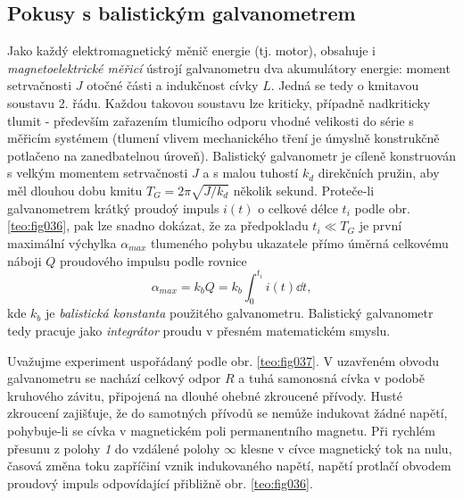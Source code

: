     \subsection{Pokusy s balistickým galvanometrem}
      Jako každý elektromagnetický měnič energie (tj. motor), obsahuje i \emph{magnetoelektrické
      měřicí} ústrojí galvanometru dva akumulátory energie: moment setrvačnosti \(J\) otoč\-né 
      části a indukčnost cívky \(L\). Jedná se tedy o kmitavou soustavu 2. řádu. Každou takovou 
      soustavu lze kriticky, případně nadkriticky tlumit - především zařazením tlumicího odporu 
      vhodné velikosti do série s měřicím systémem (tlumení vlivem mechanického tření je úmyslně 
      konstrukčně potlačeno na zanedbatelnou úroveň). Balistický galvanometr je cíleně konstruován 
      s velkým momentem setrvačnosti \(J\) a s malou tuhostí \(k_d\) direkčních pružin, aby měl 
      dlouhou dobu kmitu \(T_G = 2\pi\sqrt{J/k_d}\) několik sekund. Proteče-li galvanometrem krátký 
      proudoý impuls \(i(t)\) o celkové délce \(t_i\) podle obr. \ref{teo:fig036}, pak lze snadno 
      dokázat, že za předpokladu \(t_i\ll T_G\) je první maximální výchylka \(\alpha_{max}\) 
      tlumeného pohybu ukazatele přímo úměrná celkovému náboji \(Q\) proudového impulsu podle 
      rovnice 
      \begin{equation}\label{ES:eq_zakl_elm01}
        \alpha_{max} = k_b Q = k_b\int_0^{t_i} i(t)\dd{t},
      \end{equation}
      kde \(k_b\) je \emph{balistická konstanta} použitého galvanometru. Balistický galvanometr tedy
      pracuje jako \emph{integrátor} proudu v přesném matematickém smyslu. 
      
  
      Uvažujme experiment uspořádaný podle obr. \ref{teo:fig037}. V uzavřeném obvodu
      galvanometru se nachází celkový odpor \(R\) a tuhá samonosná cívka v podobě kruhového závitu,
      připojená na dlouhé ohebné zkroucené přívody. Husté zkroucení zajišťuje, že do samotných
      přívodů se nemůže indukovat žádné napětí, pohybuje-li se cívka v magnetickém poli 
      permanentního magnetu. Při rychlém přesunu z polohy \emph{1} do vzdálené polohy \(\infty\) 
      klesne v cívce magnetický tok na nulu, časová změna toku zapříčiní vznik indukovaného napětí, 
      napětí protlačí obvodem proudový impuls odpovídající přibližně obr. \ref{teo:fig036}.
      
